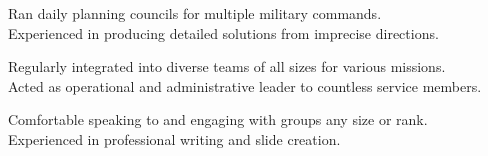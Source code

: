 Ran daily planning councils for multiple military commands. \\
Experienced in producing detailed solutions from imprecise directions.\\
\sectionsep

Regularly integrated into diverse teams of all sizes for various missions. \\
Acted as operational and administrative leader to countless service members. \\
\sectionsep

Comfortable speaking to and engaging with groups any size or rank. \\
Experienced in professional writing and slide creation. \\
\sectionsep

